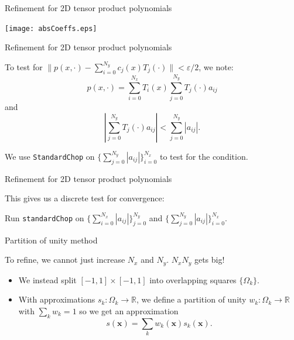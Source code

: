 \documentclass{beamer}
\newcommand{\R}{\mathbb{R}}
\newcommand{\vect}[1]{\mathbf{#1}}
\begin{document}
\begin{frame}{Refinement for 2D tensor product polynomials}

\begin{center}
\texttt{[image: absCoeffs.eps]}
\end{center}

\end{frame}

\begin{frame}{Refinement for 2D tensor product polynomials}
\begin{center}
To test for $\|p(x,\cdot) - \sum_{i=0}^{N_y} c_j(x)T_j(\cdot)\|<\varepsilon/2$, we note: $$p(x,\cdot)=\sum_{i=0}^{N_x} T_i(x) \sum_{j=0}^{N_y} T_j(\cdot)a_{ij}$$
and
$$ \left | \sum_{j=0}^{N_y} T_j(\cdot)a_{ij} \right | < \sum_{j=0}^{N_y} |a_{ij}|. $$
\end{center}

\begin{center}
We use {\tt StandardChop} on $\{ \sum_{j=0}^{N_y} |a_{ij}|  \}_{i=0}^{N_x}$ to test for the condition.
\end{center}
\end{frame}

\begin{frame}{Refinement for 2D tensor product polynomials}
\begin{center}
This gives us a discrete test for convergence:
\end{center}

\begin{center}
Run	{\tt standardChop} on $\{ \sum_{i=0}^{N_x} |a_{ij}|  \}_{j=0}^{N_y}$ and $\{ \sum_{j=0}^{N_y} |a_{ij}|  \}_{i=0}^{N_x}$.
\end{center}

\end{frame}

\begin{frame}{Partition of unity method}
\begin{center}
To refine, we cannot just increase $N_x$ and $N_y$. $N_x N_y$ gets big!
\end{center}

\begin{itemize}
\item We instead split $[-1,1] \times [-1,1]$ into overlapping squares $\{ \Omega_k \}$.
\item With approximations $s_k:\Omega_k \to \R$, we define a partition of unity $w_k:\Omega_k \to \R$ with $\sum_k w_k=1$ so we get an approximation $$s(\vect{x}) = \sum_k w_k(\vect{x})s_k(\vect{x}).$$
\end{itemize}

\end{frame}
\end{document}
